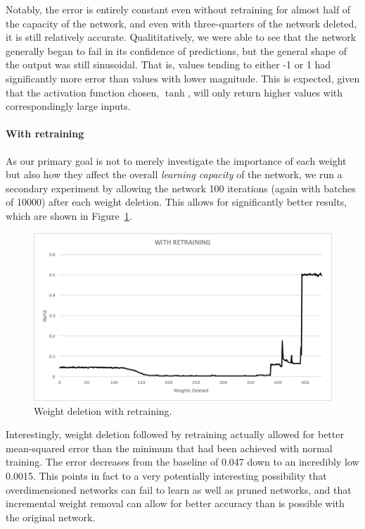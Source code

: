 \documentclass[10pt,twocolumn,letterpaper]{article}
\begin{document}
Notably, the error is entirely constant even without retraining for almost half of the capacity of the network, and even with three-quarters of the network deleted, it is still relatively accurate.
Qualititatively, we were able to see that the network generally began to fail in its confidence of predictions, but the general shape of the output was still sinusoidal.
That is, values tending to either -1 or 1 had significantly more error than values with lower magnitude.
This is expected, given that the activation function chosen, $\tanh$, will only return higher values with correspondingly large inputs.

\paragraph{With retraining} As our primary goal is not to merely investigate the importance of each weight but also how they affect the overall \emph{learning capacity} of the network, we run a secondary experiment by allowing the network 100 iterations (again with batches of 10000) after each weight deletion.
This allows for significantly better results, which are shown in Figure~\ref{fig:sin-with}.

\begin{figure}[h]
  \centering
  \includegraphics[width=\linewidth]{sin-with-retraining.pdf}
  \caption{Weight deletion with retraining.}
  \label{fig:sin-with}
\end{figure}

Interestingly, weight deletion followed by retraining actually allowed for better mean-squared error than the minimum that had been achieved with normal training.
The error decreases from the baseline of 0.047 down to an incredibly low 0.0015.
This points in fact to a very potentially interesting possibility that overdimensioned networks can fail to learn as well as pruned networks, and that incremental weight removal can allow for better accuracy than is possible with the original network.
\end{document}
